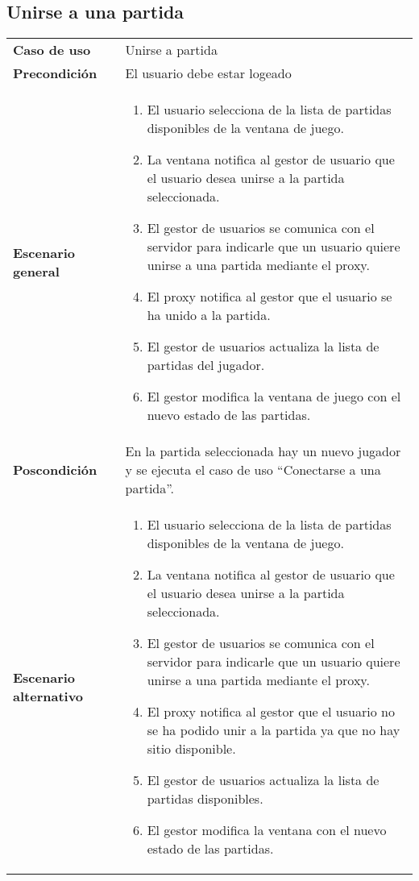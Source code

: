 \subsection{Unirse a una partida}
{\footnotesize
\begin{tabularx}{0.95\textwidth}{p{}|X}

\textbf{Caso de uso} & Unirse a partida \\

\textbf{Precondición} & El usuario debe estar logeado \\

\textbf{Escenario general} & \begin{enumerate}
\item El usuario selecciona de la lista de partidas disponibles de la ventana de
juego.
\item La ventana notifica al gestor de usuario que el usuario desea unirse a la
partida seleccionada.
\item El gestor de usuarios se comunica con el servidor para indicarle que un
usuario quiere unirse a una partida mediante el proxy.
\item El proxy notifica al gestor que el usuario se ha unido a la partida.
\item El gestor de usuarios actualiza la lista de partidas del jugador.
\item El gestor modifica la ventana de juego con el nuevo estado de las
partidas.
\end{enumerate} \\

\textbf{Poscondición} & En la partida seleccionada hay un nuevo jugador y se
ejecuta el caso de uso ``Conectarse a una partida''.\\

\textbf{Escenario alternativo} & \begin{enumerate}
\item El usuario selecciona de la lista de partidas disponibles de la ventana de
juego.
\item La ventana notifica al gestor de usuario que el usuario desea unirse a la
partida seleccionada.
\item El gestor de usuarios se comunica con el servidor para indicarle que un
usuario quiere unirse a una partida mediante el proxy.
\item El proxy notifica al gestor que el usuario no se ha podido unir a la
partida ya que no hay sitio disponible.
\item El gestor de usuarios actualiza la lista de partidas disponibles.
\item El gestor modifica la ventana con el nuevo estado de las partidas.
\end{enumerate}

\end{tabularx}
}


